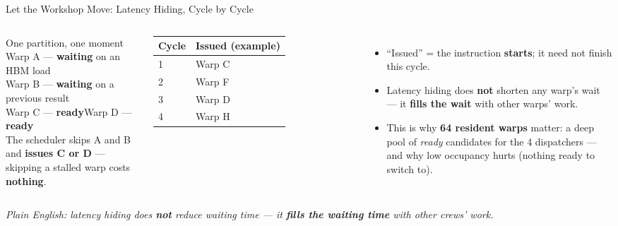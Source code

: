 \documentclass[aspectratio=169]{beamer}
\newcommand{\kw}[1]{\textbf{\textcolor{kwblue}{#1}}}
\newcommand{\pe}[1]{\par{\setlength{\fboxsep}{2.5pt}\noindent\colorbox{navy!9}{\parbox{\dimexpr\textwidth-5pt\relax}{\footnotesize\itshape Plain English: #1}}}}
\begin{document}
\begin{frame}{Let the Workshop Move: Latency Hiding, Cycle by Cycle}
  \begin{columns}[t]
    \begin{block}{One partition, one moment}
      \small
      Warp A --- \kw{waiting} on an HBM load\\
      Warp B --- \kw{waiting} on a previous result\\
      Warp C --- \kw{ready}\qquad Warp D --- \kw{ready}\\[4pt]
      The scheduler skips A and B and \kw{issues C or D} ---
      skipping a stalled warp costs \kw{nothing}.
    \end{block}
    {\small
    \begin{tabular}{@{}ll@{}}
      \toprule
      \textbf{Cycle} & \textbf{Issued (example)} \\
      \midrule
      1 & Warp C \\
      2 & Warp F \\
      3 & Warp D \\
      4 & Warp H \\
      \bottomrule
    \end{tabular}}
    \begin{itemize}
      \item ``Issued'' = the instruction \kw{starts}; it need not finish this cycle.
      \item Latency hiding does \kw{not} shorten any warp's wait ---
            it \kw{fills the wait} with other warps' work.
      \item This is why \kw{64 resident warps} matter: a deep pool of \emph{ready}
            candidates for the 4 dispatchers --- and why low occupancy hurts
            (nothing ready to switch to).
    \end{itemize}
  \end{columns}
  \pe{latency hiding does \kw{not} reduce waiting time --- it \kw{fills the waiting time} with other crews' work.}
\end{frame}
\end{document}
